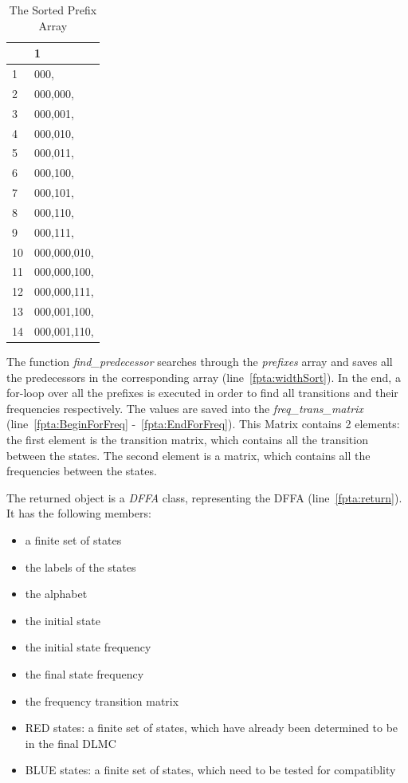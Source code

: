 \documentclass[
a4paper,
12pt
]{scrartcl}
\newcommand{\gray}{\cellcolor{grayself}}  %
\begin{document}
\begin{table}[ht!]
\centering
\begin{tabular}{|l|l|}
\hline
\gray & \gray  1                                 \\ \hline
\gray 1&000,         \\ \hline
\gray 2&000,000,     \\ \hline
\gray 3&000,001,     \\ \hline
\gray 4&000,010,     \\ \hline
\gray 5&000,011,     \\ \hline
\gray 6&000,100,     \\ \hline
\gray 7&000,101,     \\ \hline
\gray 8&000,110,     \\ \hline
\gray 9&000,111,     \\ \hline
\gray 10&000,000,010, \\ \hline
\gray 11&000,000,100, \\ \hline
\gray 12&000,000,111, \\ \hline
\gray 13&000,001,100, \\ \hline
\gray 14&000,001,110, \\ \hline
\end{tabular}
\caption{The Sorted Prefix Array}
\label{table:sortPrefix}
\end{table}

The function \emph{find\_predecessor} searches through the \emph{prefixes} array and saves all the predecessors in the corresponding array (line~\ref{fpta:widthSort}). In the end, a for-loop over all the prefixes is executed in order to find all transitions and their frequencies respectively. The values are saved into the \emph{freq\_trans\_matrix}  (line~\ref{fpta:BeginForFreq} -~\ref{fpta:EndForFreq}). This Matrix contains 2 elements: the first element is the transition matrix, which contains all the transition between the states. The second element is a matrix, which contains all the frequencies between the states.

The returned object is a \emph{DFFA} class, representing the DFFA (line~\ref{fpta:return}). It has the following members:
\begin{itemize}
      \item a finite set of states
      \item the labels of the states
      \item the alphabet
      \item the initial state
      \item the initial state frequency
      \item the final state frequency
      \item the frequency transition matrix
      \item RED states: a finite set of states, which have already been determined to be in the final DLMC
      \item BLUE states: a finite set of states, which need to be tested for compatiblity
   \end{itemize}
\end{document}
